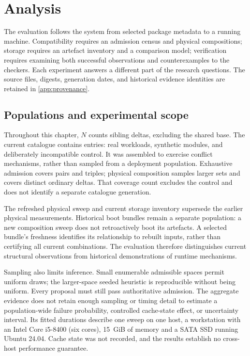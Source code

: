 \chapter{Analysis}
\label{ch:analysis}

The evaluation follows the system from selected package metadata to a running machine. Compatibility requires an admission census and physical compositions; storage requires an artefact inventory and a comparison model; verification requires examining both successful observations and counterexamples to the checkers. Each experiment answers a different part of the research questions. The source files, digests, generation dates, and historical evidence identities are retained in \cref{app:provenance}.

\section{Populations and experimental scope}

Throughout this chapter, $N$ counts sibling deltas, excluding the shared base. The current catalogue contains  entries:  real workloads,  synthetic modules, and  deliberately incompatible control. It was assembled to exercise conflict mechanisms, rather than sampled from a deployment population. Exhaustive admission covers pairs and triples; physical composition samples larger sets and covers  distinct ordinary deltas. That coverage count excludes the control and does not identify a separate catalogue generation.

The refreshed physical sweep and current storage inventory supersede the earlier physical measurements. Historical boot bundles remain a separate population: a new composition sweep does not retroactively boot its artefacts. A selected bundle's freshness identifies its relationship to rebuilt inputs, rather than certifying all current combinations. The evaluation therefore distinguishes current structural observations from historical demonstrations of runtime mechanisms.

Sampling also limits inference. Small enumerable admissible spaces permit uniform draws; the larger-space seeded heuristic is reproducible without being uniform. Every proposal must still pass authoritative admission. The aggregate evidence does not retain enough sampling or timing detail to estimate a population-wide failure probability, controlled cache-state effect, or uncertainty interval. Its fitted durations describe one sweep on one host, a workstation with an Intel Core i5-8400 (six cores), 15~GiB of memory and a SATA SSD running Ubuntu \num{24.04}. Cache state was not recorded, and the results establish no cross-host performance guarantee.

